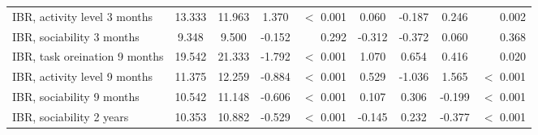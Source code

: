 \begin{tabular}{l c c c r c c c r}
IBR, activity level 3 months & 13.333 & 11.963 & 1.370 & $ < $ 0.001 & 0.060 & -0.187 & 0.246 & 0.002 \\
IBR, sociability 3 months & 9.348 & 9.500 & -0.152 & 0.292 & -0.312 & -0.372 & 0.060 & 0.368 \\
IBR, task oreination 9 months & 19.542 & 21.333 & -1.792 & $ < $ 0.001 & 1.070 & 0.654 & 0.416 & 0.020 \\
IBR, activity level 9 months & 11.375 & 12.259 & -0.884 & $ < $ 0.001 & 0.529 & -1.036 & 1.565 & $ < $ 0.001 \\
IBR, sociability 9 months & 10.542 & 11.148 & -0.606 & $ < $ 0.001 & 0.107 & 0.306 & -0.199 & $ < $ 0.001 \\
IBR, sociability 2 years & 10.353 & 10.882 & -0.529 & $ < $ 0.001 & -0.145 & 0.232 & -0.377 & $ < $ 0.001 \\
\bottomrule
\end{tabular}
